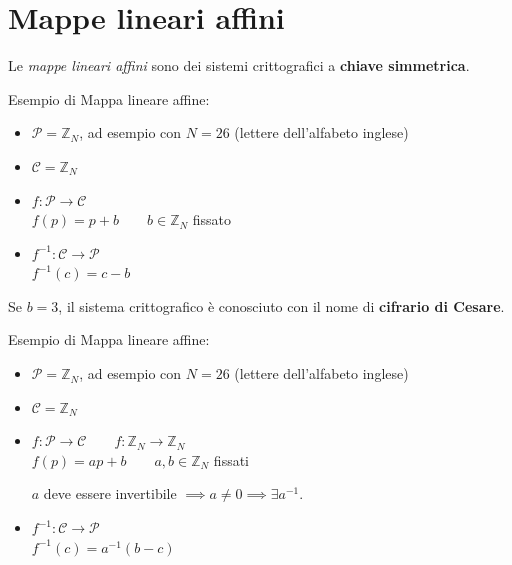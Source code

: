 \documentclass[a4paper,12pt, oneside]{book}
\begin{document}
	\section{Mappe lineari affini}
		Le \textit{mappe lineari affini} sono dei sistemi crittografici a \textbf{chiave simmetrica}.
		\begin{esempio}
			Esempio di Mappa lineare affine:\\
			\begin{itemize}
				\item $\mathcal{P} = \mathbb{Z}_N$, ad esempio con $N = 26$ (lettere dell'alfabeto inglese)
				\item $\mathcal{C} = \mathbb{Z}_N$
				\item $f: \mathcal{P} \rightarrow \mathcal{C}$\\
					$f(p) = p+b \qquad b \in \mathbb{Z}_N$ fissato
				\item $f^{-1}: \mathcal{C} \rightarrow \mathcal{P}$\\
					$f^{-1}(c) = c-b$
			\end{itemize}
			\begin{nota}
				Se $b=3$, il sistema crittografico è conosciuto con il nome di \textbf{cifrario di Cesare}.
			\end{nota}
		\end{esempio}
		\begin{esempio}
			Esempio di Mappa lineare affine:\\
			\begin{itemize}
				\item $\mathcal{P} = \mathbb{Z}_N$, ad esempio con $N = 26$ (lettere dell'alfabeto inglese)
				\item $\mathcal{C} = \mathbb{Z}_N$
				\item $f: \mathcal{P} \rightarrow \mathcal{C} \qquad f: \mathbb{Z}_N \rightarrow \mathbb{Z}_N$\\
					$f(p) = ap+b \qquad a,b \in \mathbb{Z}_N$ fissati
					\begin{nota}
						$a$ deve essere invertibile $\implies a \not = 0 \implies \exists a^{-1}$.
					\end{nota}
				\item $f^{-1}: \mathcal{C} \rightarrow \mathcal{P}$\\
					$f^{-1}(c) = a^{-1}(b-c)$
			\end{itemize}
		\end{esempio}
\end{document}
